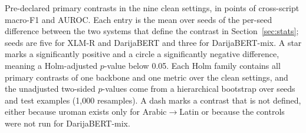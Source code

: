 \begin{table}[t]
\caption{Pre-declared primary contrasts in the nine clean settings, in points of cross-script macro-F1 and AUROC. Each entry is the mean over seeds of the per-seed difference between the two systems that define the contrast in Section~\ref{sec:stats}; seeds are five for XLM-R and DarijaBERT and three for DarijaBERT-mix. A star marks a significantly positive and a circle a significantly negative difference, meaning a Holm-adjusted $p$-value below 0.05. Each Holm family contains all primary contrasts of one backbone and one metric over the clean settings, and the unadjusted two-sided $p$-values come from a hierarchical bootstrap over seeds and test examples (1{,}000 resamples). A dash marks a contrast that is not defined, either because uroman exists only for Arabic$\to$Latin or because the controls were not run for DarijaBERT-mix.}
\label{tab:contrasts}
\centering\footnotesize
\setlength{\tabcolsep}{4pt}
\fitbox{\textwidth}
\end{table}